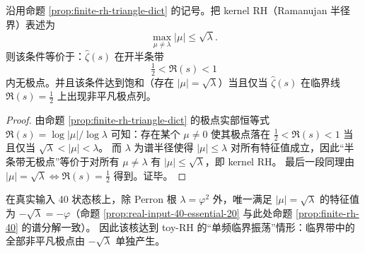 \begin{corollary}\label{cor:finite-rh-halfstrip-nopoles}
沿用命题 \ref{prop:finite-rh-triangle-dict} 的记号。把 kernel RH（Ramanujan 半径界）表述为
\[
\max_{\mu\neq \lambda}|\mu|\le \sqrt{\lambda}.
\]
则该条件等价于：\(\widehat{\zeta}(s)\) 在开半条带
\[
\tfrac12<\Re(s)<1
\]
内无极点。并且该条件达到饱和（存在 \(|\mu|=\sqrt{\lambda}\)）当且仅当 \(\widehat{\zeta}(s)\) 在临界线 \(\Re(s)=\tfrac12\) 上出现非平凡极点列。
\end{corollary}
\begin{proof}
由命题 \ref{prop:finite-rh-triangle-dict} 的极点实部恒等式 \(\Re(s)=\log|\mu|/\log\lambda\) 可知：存在某个 \(\mu\neq 0\) 使其极点落在 \(\tfrac12<\Re(s)<1\) 当且仅当 \(\sqrt{\lambda}<|\mu|<\lambda\)。
而 \(\lambda\) 为谱半径使得 \(|\mu|\le \lambda\) 对所有特征值成立，因此“半条带无极点”等价于对所有 \(\mu\neq\lambda\) 有 \(|\mu|\le \sqrt{\lambda}\)，即 kernel RH。
最后一段同理由 \(|\mu|=\sqrt{\lambda}\iff \Re(s)=\tfrac12\) 得到。证毕。
\end{proof}

\begin{remark}[本核的达界位置：唯一临界模长 \texorpdfstring{$|\mu|=\sqrt{\lambda}$}{|mu|=sqrt(lambda)}]\label{rem:finite-rh-40-ramanujan}
在真实输入 40 状态核上，除 Perron 根 $\lambda=\varphi^2$ 外，唯一满足 $|\mu|=\sqrt{\lambda}$ 的特征值为 $-\sqrt{\lambda}=-\varphi$（命题 \ref{prop:real-input-40-essential-20} 与此处命题 \ref{prop:finite-rh-40} 的谱分解一致）。
因此该核达到 toy-RH 的“单频临界振荡”情形：临界带中的全部非平凡极点由 $-\sqrt{\lambda}$ 单独产生。
\end{remark}

